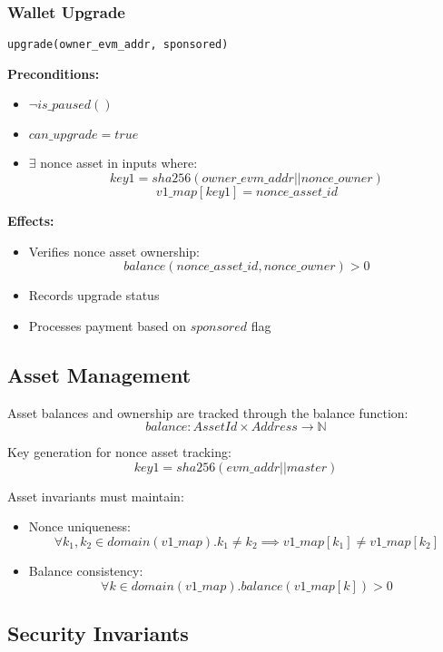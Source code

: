 \subsubsection{Wallet Upgrade}
\begin{lstlisting}
upgrade(owner_evm_addr, sponsored)
\end{lstlisting}

\textbf{Preconditions:}
\begin{itemize}
    \item $\neg is\_paused()$
    \item $can\_upgrade = true$
    \item $\exists$ nonce asset in inputs where:
        \[ key1 = sha256(owner\_evm\_addr || nonce\_owner) \]
        \[ v1\_map[key1] = nonce\_asset\_id \]
\end{itemize}

\textbf{Effects:}
\begin{itemize}
    \item Verifies nonce asset ownership:
        \[ balance(nonce\_asset\_id, nonce\_owner) > 0 \]
    \item Records upgrade status
    \item Processes payment based on $sponsored$ flag
\end{itemize}

\subsection{Asset Management}
Asset balances and ownership are tracked through the balance function:
\[ balance: AssetId \times Address \rightarrow \mathbb{N} \]

Key generation for nonce asset tracking:
\[ key1 = sha256(evm\_addr || master) \]

Asset invariants must maintain:
\begin{itemize}
    \item Nonce uniqueness:
        \[ \forall k_1,k_2 \in domain(v1\_map). k_1 \neq k_2 \implies v1\_map[k_1] \neq v1\_map[k_2] \]
    \item Balance consistency:
        \[ \forall k \in domain(v1\_map). balance(v1\_map[k]) > 0 \]
\end{itemize}


\subsection{Security Invariants}

